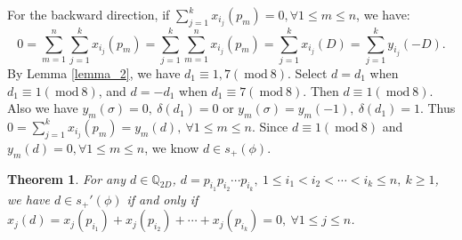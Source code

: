 \documentclass{amsart}
\numberwithin{equation}{section}
\theoremstyle{plain}
\newtheorem{thm_}[equation]{Theorem}
\theoremstyle{definition}
\newcommand{\thm}[1]{\begin{thm_}#1\end{thm_}}
\newcommand{\QQ}{\mathbb Q}
\renewcommand{\mod}[1]{\ \mathrm{mod}\ #1}  %
\begin{document}
{For the backward direction, if $\sum\limits_{j=1}^k x_{i_j}(p_m) = 0, \forall 1 \le m \le n$, we have:
$$0 = \sum\limits_{m=1}^n \sum\limits_{j=1}^k x_{i_j}(p_m) = \sum\limits_{j=1}^k\sum\limits_{m=1}^n x_{i_j}(p_m) =\sum\limits_{j=1}^k x_{i_j}(D) = \sum\limits_{j=1}^k y_{i_j}(-D). $$
By Lemma \ref{lemma_2}, we have $d_1 \equiv 1,7 (\mod 8)$. Select $d = d_1$ when $d_1 \equiv 1 (\mod 8)$, and $d = -d_1$ when $d_1 \equiv 7 (\mod 8)$. Then $d \equiv 1 (\mod 8)$. Also we have $y_m(\sigma) = 0,\  \delta(d_1) = 0$ or $y_m(\sigma) =  y_m(-1),\ \delta(d_1) = 1$. Thus $0 = \sum\limits_{j=1}^k x_{i_j}(p_m)= y_m(d),\  \forall 1\le m \le n$. Since $d \equiv 1 (\mod 8)$ and $y_m(d) = 0, \forall 1\le m \le n$, we know $d \in s_+(\phi)$.
}

\thm{\label{thm4}For any $d \in \QQ_{2D}$, $d = p_{i_1}p_{i_2}\cdots p_{i_k} , \ 1\le i_1 < i_2 < \cdots < i_k \le n, \ k \ge 1$, we have $d \in s_+'(\phi)$ if and only if $x_{j}(d) =  x_{j}(p_{i_1}) + x_{j}(p_{i_2}) + \cdots + x_{j}(p_{i_k}) = 0 ,\ \forall 1\le j \le n$.}
\end{document}
